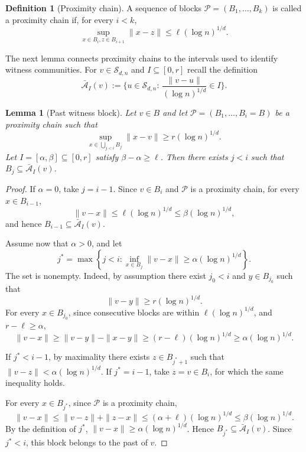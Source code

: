 \documentclass[11pt, a4paper]{amsart}
\newtheorem{lemma}[theorem]{Lemma}
\newcommand{\1}{\mathbf{1}}
\theoremstyle{definition}
\newtheorem{definition}[theorem]{Definition}
\theoremstyle{remark}
\theoremstyle{definition}
\begin{document}
\begin{definition}[Proximity chain]
A sequence of blocks $\mathcal P=(B_1,\ldots,B_k)$ is called a
proximity chain if, for every $i<k$,
\[
\sup_{x\in B_i, z\in B_{i+1}}\|x-z\|
\le \ell(\log n)^{1/d}.
\]
\end{definition}

The next lemma connects proximity chains to the intervals used to identify witness communities. For $v \in \mathcal S_{d,n}$ and $I \subseteq [0,r]$ recall the definition
\[
\bar{\mathcal A}_I(v):=\Big\{u \in \mathcal S_{d,n}:\,\frac{\|v-u\|}{(\log n)^{1/d}} \in I\Big\}.
\]

\begin{lemma}[Past witness block]
\label{lem:past_witness_block}
Let $v\in B$ and let $\mathcal P=(B_1,\ldots,B_i=B)$ be a proximity chain such that
\[
\sup_{x\in \bigcup_{j<i}B_j}\|x-v\|
\ge r(\log n)^{1/d}.
\]
Let $I=[\alpha,\beta]\subseteq[0,r]$ satisfy
$\beta-\alpha\ge \ell$. Then there exists $j<i$ such that $B_j\subseteq \bar{\mathcal A}_I(v)$. 
\end{lemma}


\begin{proof}
If $\alpha=0$, take $j=i-1$. Since $v\in B_i$ and $\mathcal P$ is a proximity chain,
for every $x\in B_{i-1}$,
\[
\|v-x\|
\le \ell(\log n)^{1/d}
\le \beta(\log n)^{1/d},
\]
and hence $B_{i-1}\subseteq \bar{\mathcal A}_I(v)$.

Assume now that $\alpha>0$, and let
\[
j^*
=
\max\left\{
j<i:
\inf_{x\in B_j}\|v-x\|
\ge\alpha(\log n)^{1/d}
\right\}.
\]
The set is nonempty. Indeed, by assumption there exist $j_0<i$ and
$y\in B_{j_0}$ such that
\[
\|v-y\|\ge r(\log n)^{1/d}.
\]
For every $x\in B_{j_0}$, since consecutive blocks are within $\ell(\log n)^{1/d}$, and $r-\ell \ge \alpha$,
\[
\|v-x\|
\ge \|v-y\|-\|x-y\|
\ge (r-\ell)(\log n)^{1/d}
\ge \alpha(\log n)^{1/d}.
\]

If $j^*<i-1$, by maximality there exists $z\in B_{j^*+1}$ such that $
\|v-z\|<\alpha(\log n)^{1/d}$.
If $j^*=i-1$, take $z=v\in B_i$, for which the same inequality holds.

For every $x\in B_{j^*}$, since $\mathcal P$ is a proximity chain,
\[
\|v-x\|
\le
\|v-z\|+\|z-x\|
\le
(\alpha+\ell)(\log n)^{1/d}
\le
\beta(\log n)^{1/d}.
\]
By the definition of $j^*$, $\|v-x\|\ge\alpha(\log n)^{1/d}$.
Hence $B_{j^*}\subseteq \bar{\mathcal A}_I(v)$. Since $j^*<i$, this block
belongs to the past of $v$.
\end{proof}
\end{document}
